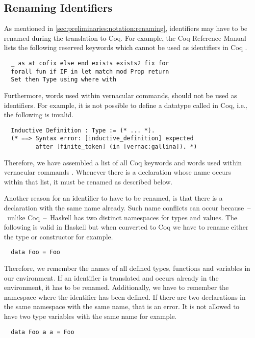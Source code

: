 \subsection{Renaming Identifiers} \label{sec:implementation:conversion:renaming}
As mentioned in \autoref{sec:preliminaries:notation:renaming}, identifiers may have to be renamed during the translation to Coq.
For example, the Coq Reference Manual lists the following reserved keywords which cannot be used as identifiers in Coq \cite[p.~24]{CoqDevTeam:2018}.
\begin{verbatim}
  _ as at cofix else end exists exists2 fix for
  forall fun if IF in let match mod Prop return
  Set then Type using where with
\end{verbatim}
Furthermore, words used within vernacular commands, should not be used as identifiers.
For example, it is not possible to define a datatype called  in Coq, i.e., the following is invalid.
\begin{verbatim}
  Inductive Definition : Type := (* ... *).
  (* ==> Syntax error: [inductive_definition] expected
         after [finite_token] (in [vernac:gallina]). *)
\end{verbatim}
Therefore, we have assembled a list of all Coq keywords and words used within vernacular commands \cite[pp.~484-487]{CoqDevTeam:2018}.
Whenever there is a declaration whose name occurs within that list, it must be renamed as described below.

Another reason for an identifier to have to be renamed, is that there is a declaration with the same name already.
Such name conflicts can occur because~--~unlike Coq~--~Haskell has two distinct namespaces for types and values.
The following is valid in Haskell but when converted to Coq we have to rename either the type or constructor for example.
\begin{verbatim}
  data Foo = Foo
\end{verbatim}
Therefore, we remember the names of all defined types, functions and variables in our environment.
If an identifier is translated and occurs already in the environment, it has to be renamed.
Additionally, we have to remember the namespace where the identifier has been defined.
If there are two declarations in the same namespace with the same name, that is an error.
It is not allowed to have two type variables with the same name for example.
\begin{verbatim}
  data Foo a a = Foo
\end{verbatim}

